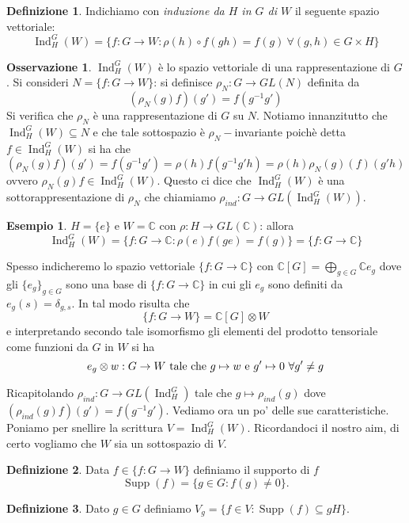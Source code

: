 \documentclass[11pt]{article}
\theoremstyle{plain}
\theoremstyle{definition}
\newtheorem{defn}{Definizione}[section]
\newtheorem{exmp}{Esempio}[section]
\newtheorem*{rem}{Osservazione}
\theoremstyle{remark}
\newcommand{\C}{\mathbb{C}}
\DeclareMathOperator{\Supp}{Supp}
\DeclareMathOperator{\Ind}{Ind}
\begin{document}
\begin{defn}Indichiamo con \emph{induzione da $H$ in $G$ di $W$} il seguente spazio vettoriale:
\[\Ind_H^G(W)=\{f:G\rightarrow W: \rho(h)\circ f(gh)=f(g)\ \forall (g,h)\in G\times H\}   \]
\end{defn}

\begin{rem} $\Ind_H^G(W)$ è lo spazio vettoriale di una rappresentazione di $G$.
Si consideri $N=\{f:G\rightarrow W\}$: si definisce $\rho_N:G\rightarrow GL(N)$ definita da
\[ (\rho_N(g)f)(g')=f(g^{-1}g')\]
Si verifica che $\rho_N$ è una rappresentazione di $G$ su $N$. Notiamo innanzitutto che $\Ind_H^G(W)\subseteq N$ e che tale sottospazio è $\rho_N-$invariante poichè detta $f\in \Ind_H^G(W)$ si ha che
\[ (\rho_N(g)f)(g')=f(g^{-1}g')=\rho(h)f(g^{-1}g'h)=\rho(h)\rho_N(g)(f)(g'h)\]
ovvero $\rho_N(g)f\in \Ind_H^G(W)$. Questo ci dice che $\Ind_H^G(W)$ è una sottorappresentazione di $\rho_N$ che chiamiamo $\rho_{ind}:G\rightarrow GL(\Ind_H^G(W))$.
\end{rem}

\begin{exmp}
$H=\{e\}$ e $W=\C$ con $\rho:H\rightarrow GL(\C)$: allora
\[\Ind_H^G(W)=\{f:G\rightarrow \C:\rho(e)f(ge)=f(g)\}=\{f:G\rightarrow \C\}\]
\end{exmp}

Spesso indicheremo lo spazio vettoriale $\{f:G\rightarrow \C\}$ con $\C[G]=\bigoplus_{g\in G}\C e_g$ dove gli $\{e_g\}_{g\in G}$ sono una base di $\{f:G\rightarrow \C\}$
in cui gli $e_g$ sono definiti da $e_g(s) = \delta_{g,s}$.
In tal modo risulta che
\[\{f:G\rightarrow W\}=\C[G]\otimes W\]
e interpretando secondo tale isomorfismo gli elementi del prodotto tensoriale come funzioni da $G$ in $W$ si ha
\[e_g\otimes w:G\rightarrow W \textup{ tale che } g\mapsto w \textup{ e } g'\mapsto 0\ \forall g'\neq g\]

Ricapitolando $\rho_{ind}:G\to GL(\Ind_H^G)$ tale che $g\mapsto \rho_{ind}(g)$ dove $(\rho_{ind}(g)f)(g')=f(g^{-1}g')$. Vediamo ora un po' delle sue caratteristiche. Poniamo per snellire la scrittura $V=\Ind_H^G(W)$. Ricordandoci il nostro aim, di certo vogliamo che $W$ sia un sottospazio di $V$.

\begin{defn}
Data $f\in \{f:G\rightarrow W\}$ definiamo il supporto di $f$
\[\Supp(f)=\{g\in G:f(g)\neq 0\}.\]
\end{defn}

\begin{defn}
Dato $g\in G$ definiamo $V_g=\{f\in V : \Supp(f)\subseteq gH \}$.
\end{defn}
\end{document}
